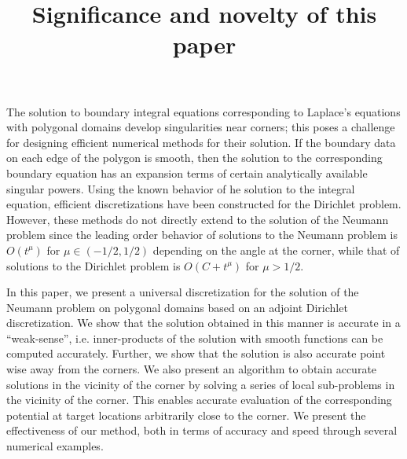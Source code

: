 \documentclass[10pt]{article}
\begin{document}
 \title{Significance and novelty of this paper}
 \maketitle
The solution to boundary integral equations corresponding to Laplace's equations
with polygonal domains
develop singularities near corners; this poses a challenge for designing
efficient numerical methods for their solution. 
If the boundary data on each edge of the polygon is smooth, then the solution
to the corresponding boundary equation has an expansion terms of certain analytically
available singular powers. 
Using the known behavior of he solution to the integral equation, efficient
discretizations have been constructed for the Dirichlet problem.
However, these methods do not directly extend to the solution of the Neumann problem
since the leading order behavior of solutions to the Neumann problem is $O(t^{\mu})$ 
for $\mu \in (-1/2,1/2)$ depending on the angle at the corner, while that of solutions
to the Dirichlet problem is $O(C + t^{\mu})$ for $\mu>1/2$. 

In this paper, we present a universal discretization for the solution of the Neumann problem
on polygonal domains based on an adjoint Dirichlet discretization.
We show that the solution obtained in this manner is accurate in a ``weak-sense'', i.e. 
inner-products of the solution with smooth functions can be computed accurately. 
Further, we show that the solution is also accurate point wise away from the corners. 
We also present an algorithm to obtain accurate solutions in the vicinity of the corner
by solving a series of local sub-problems in the vicinity of the corner. 
This enables accurate evaluation of the corresponding potential at target locations arbitrarily
close to the corner. We present the effectiveness of our method, both in terms of accuracy
and speed through several numerical examples.
\end{document}
